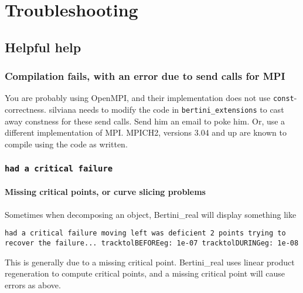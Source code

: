 
\section{Troubleshooting}

\subsection{Helpful help}

\subsubsection{Compilation fails, with an error due to send calls for MPI}

You are probably using OpenMPI, and their implementation does not use {\tt const}-correctness.  silviana needs to modify the code in {\tt bertini\_extensions} to cast away constness for these send calls.  Send him an email to poke him.  Or, use a different implementation of MPI.  MPICH2, versions 3.04 and up are known to compile using the code as written. 




\subsubsection{\tt had a critical failure}

\paragraph{Missing critical points, or curve slicing problems}

Sometimes when decomposing an object, Bertini\_real will display something like

{\tt	had a critical failure
 moving left was deficient 2 points
trying to recover the failure...
tracktolBEFOREeg: 1e-07 tracktolDURINGeg: 1e-08
}

This is generally due to a missing critical point.  Bertini\_real uses linear product regeneration to compute critical points, and a missing critical point will cause errors as above.  

